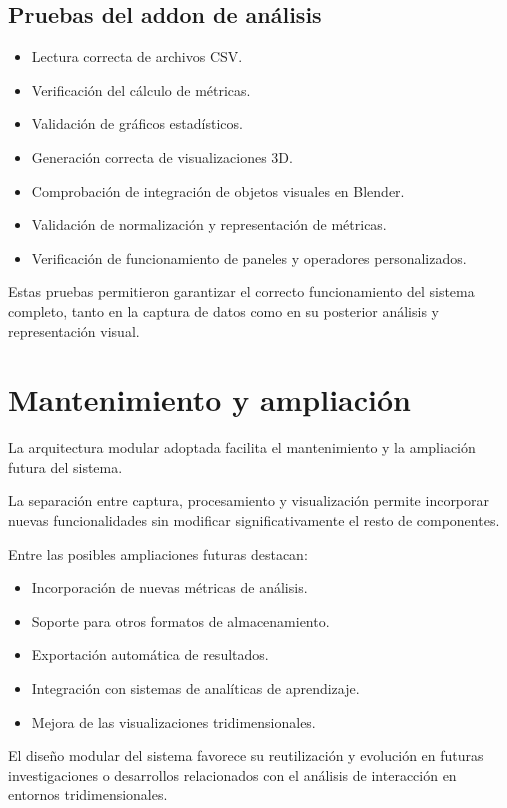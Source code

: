 \subsection{Pruebas del addon de análisis}

\begin{itemize}
    \item Lectura correcta de archivos CSV.
    \item Verificación del cálculo de métricas.
    \item Validación de gráficos estadísticos.
    \item Generación correcta de visualizaciones 3D.
    \item Comprobación de integración de objetos visuales en Blender.
    \item Validación de normalización y representación de métricas.
    \item Verificación de funcionamiento de paneles y operadores personalizados.
\end{itemize}

Estas pruebas permitieron garantizar el correcto funcionamiento del sistema completo, tanto en la captura de datos como en su posterior análisis y representación visual.

\section{Mantenimiento y ampliación}

La arquitectura modular adoptada facilita el mantenimiento y la ampliación futura del sistema.

La separación entre captura, procesamiento y visualización permite incorporar nuevas funcionalidades sin modificar significativamente el resto de componentes.

Entre las posibles ampliaciones futuras destacan:

\begin{itemize}
    \item Incorporación de nuevas métricas de análisis.
    \item Soporte para otros formatos de almacenamiento.
    \item Exportación automática de resultados.
    \item Integración con sistemas de analíticas de aprendizaje.
    \item Mejora de las visualizaciones tridimensionales.
\end{itemize}

El diseño modular del sistema favorece su reutilización y evolución en futuras investigaciones o desarrollos relacionados con el análisis de interacción en entornos tridimensionales.